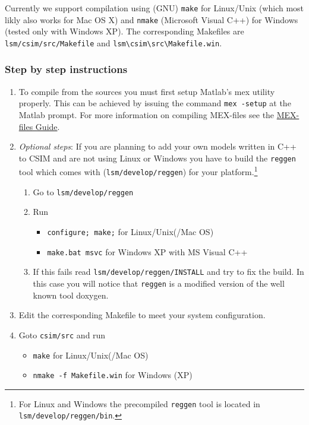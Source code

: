  

Currently we support compilation using (GNU) \texttt{make} for Linux/Unix
(which most likly also works for Mac OS X) and \texttt{nmake} (Microsoft
Visual C++) for Windows (tested only with Windows XP). The corresponding
Makefiles are \verb+lsm/csim/src/Makefile+ and
\verb+lsm\csim\src\Makefile.win+.

\subsubsection*{Step by step instructions}

\begin{enumerate}

\item To compile \csim from the sources you must first setup Matlab's mex utility
properly. This can be achieved by issuing the command \verb+mex -setup+ at the
Matlab prompt. For more information on compiling MEX-files see the
\href{http://www.mathworks.com/support/tech-notes/1600/1605.html}{MEX-files
  Guide}.

\item \emph{Optional steps}: \small If you are planning to add your own models
  written in C++ to CSIM and are not using Linux or Windows you have to build
  the \texttt{reggen} tool which comes with \csim (\verb+lsm/develop/reggen+)
  for your platform.\footnote{For Linux and Windows the precompiled
    \texttt{reggen} tool is located in \texttt{lsm/develop/reggen/bin}.}

  \begin{enumerate}
      \item Go to \verb+lsm/develop/reggen+
      \item Run 
      \begin{itemize}
        \item \verb+configure; make;+ for Linux/Unix(/Mac OS)
        \item \verb+make.bat msvc+ for Windows XP with MS Visual C++ 
      \end{itemize}
    \item If this fails read \verb+lsm/develop/reggen/INSTALL+ and try to fix
      the build. In this case you will notice that \verb+reggen+ is a modified
      version of the well known tool doxygen.
  \end{enumerate}

\normalsize 

\item Edit the corresponding Makefile to meet your system configuration.

\item Goto \verb+csim/src+ and run
      \begin{itemize}
        \item \verb+make+ for Linux/Unix(/Mac OS)
        \item \verb+nmake -f Makefile.win+ for Windows (XP)
      \end{itemize}

\end{enumerate}

